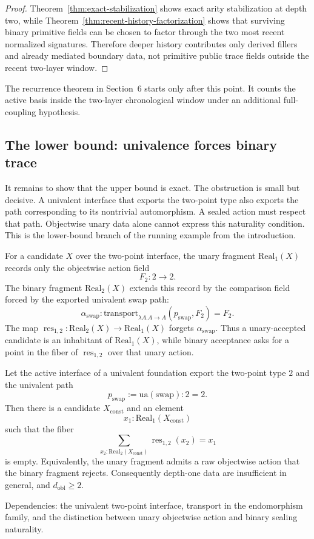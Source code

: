 \documentclass{lmcs}
\newcommand{\Real}{\mathrm{Real}}
\newcommand{\res}{\operatorname{res}}
\begin{document}
\begin{proof}
Theorem~\ref{thm:exact-stabilization} shows exact arity stabilization at depth two, while
Theorem~\ref{thm:recent-history-factorization} shows that surviving binary primitive fields
can be chosen to factor through the two most recent normalized signatures.  Therefore deeper
history contributes only derived fillers and already mediated boundary data, not primitive
public trace fields outside the recent two-layer window.
\end{proof}

The recurrence theorem in Section~6 starts only after this point.  It counts the active basis
inside the two-layer chronological window under an additional full-coupling hypothesis.

\subsection{The lower bound: univalence forces binary trace}
\label{subsec:swap-lower-bound}

It remains to show that the upper bound is exact.  The obstruction is small but decisive.
A univalent interface that exports the two-point type also exports the path corresponding to
its nontrivial automorphism.  A sealed action must respect that path.  Objectwise unary data
alone cannot express this naturality condition.  This is the lower-bound branch of the
running example from the introduction.

\begin{defi}
\label{def:swap-unary-binary-fragments}
For a candidate \(X\) over the two-point interface, the unary fragment
\(\Real_1(X)\) records only the objectwise action field
\[
  F_2:2\to 2.
\]
The binary fragment \(\Real_2(X)\) extends this record by the comparison field forced by the
exported univalent swap path:
\[
  \alpha_{\mathrm{swap}}:
  \mathrm{transport}_{\lambda A. A\to A}(p_{\mathrm{swap}},F_2)=F_2.
\]
The map \(\res_{1,2}:\Real_2(X)\to\Real_1(X)\) forgets
\(\alpha_{\mathrm{swap}}\).  Thus a unary-accepted candidate is an inhabitant of
\(\Real_1(X)\), while binary acceptance asks for a point in the fiber of
\(\res_{1,2}\) over that unary action.
\end{defi}

\begin{thm}
\label{thm:swap-obstruction}
Let the active interface of a univalent foundation export the two-point type \(2\) and the
univalent path
\[
  p_{\mathrm{swap}} := \mathrm{ua}(\mathrm{swap}) : 2 = 2.
\]
Then there is a candidate \(X_{\mathrm{const}}\) and an element
\[
  x_1:\Real_1(X_{\mathrm{const}})
\]
such that the fiber
\[
  \sum_{x_2:\Real_2(X_{\mathrm{const}})}
  \res_{1,2}(x_2)=x_1
\]
is empty.  Equivalently, the unary fragment admits a raw objectwise action that the binary
fragment rejects.  Consequently depth-one data are insufficient in general, and
\(d_{\mathrm{obl}}\geq 2\).

Dependencies: the univalent two-point interface, transport in the endomorphism family, and
the distinction between unary objectwise action and binary sealing naturality.
\end{thm}
\end{document}
